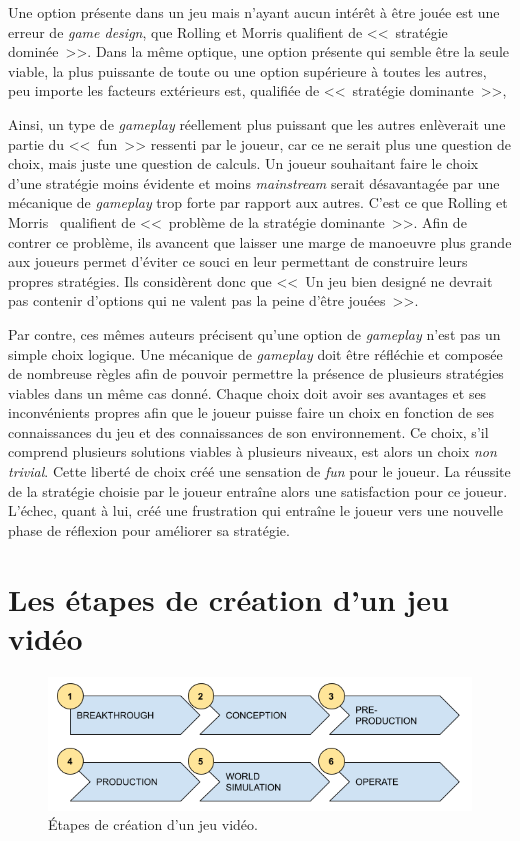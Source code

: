 Une option présente dans un jeu mais n'ayant aucun intérêt \`a être jouée est une erreur de \emph{game design}, que Rolling et Morris qualifient de <<~stratégie dominée~>>. 
Dans la même optique, une option présente qui semble être la seule viable, la plus puissante de toute ou une option supérieure à toutes les autres, peu importe les facteurs extérieurs est, qualifiée de <<~stratégie dominante~>>,

Ainsi, un type de \emph{gameplay} réellement plus puissant que les autres enlèverait une partie du <<~fun~>> ressenti par le joueur, car ce ne serait plus une question de choix, mais juste une question de calculs.
Un joueur souhaitant faire le choix d'une stratégie moins évidente et moins \emph{mainstream} serait désavantagée par une mécanique de \emph{gameplay} trop forte par rapport aux autres.
C'est ce que Rolling et Morris~\cite{Rollings2004} qualifient de <<~problème de la stratégie dominante~>>. 
Afin de contrer ce problème, ils avancent que laisser une marge de manoeuvre plus grande aux joueurs permet d'éviter ce souci en leur permettant de construire leurs propres stratégies.
Ils considèrent donc que <<~Un jeu bien designé ne devrait pas contenir d'options qui ne valent pas la peine d'être jouées~>>.

Par contre, ces m\^emes auteurs précisent qu'une option de \emph{gameplay} n'est pas un simple choix logique.
Une mécanique de \emph{gameplay} doit être réfléchie et composée de nombreuse règles afin de pouvoir permettre la présence de plusieurs stratégies viables dans un même cas donné.
%
Chaque choix doit avoir ses avantages et ses inconvénients propres afin que le joueur puisse faire un choix en fonction de ses connaissances du jeu et des connaissances de son environnement.
Ce choix, s'il comprend plusieurs solutions viables à plusieurs niveaux, est alors un choix \emph{non trivial}.
Cette liberté de choix créé une sensation de \emph{fun} pour le joueur.
%
La réussite de la stratégie choisie par le joueur entraîne alors une satisfaction pour ce joueur.
L'échec, quant à lui, créé une frustration qui entraîne le joueur vers une nouvelle phase de réflexion pour améliorer sa stratégie.


\section{Les étapes de création d'un jeu vid\'eo}
\begin{figure}[H]
    \centering
    \includegraphics[width=14cm]{10_img/production_stages.png} 
    \caption{Étapes de création d'un jeu vidéo.}
    \label{fig.etapes}
\end{figure}


